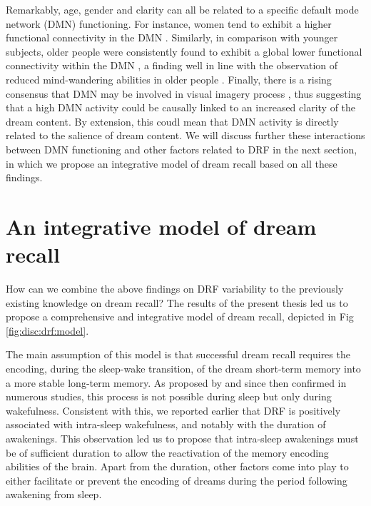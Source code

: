 Remarkably, age, gender and clarity can all be related to a specific default mode network (DMN) functioning. For instance, women tend to exhibit a higher functional connectivity in the DMN \citep{bluhm_default_2008}. Similarly, in comparison with younger subjects, older people were consistently found to exhibit a global lower functional connectivity within the DMN \citep{damoiseaux_reduced_2008, koch_effects_2010}, a finding well in line with the observation of reduced mind-wandering abilities in older people \citep{jackson_mind-wandering_2012}. Finally, there is a rising consensus that DMN may be involved in visual imagery process \citep{andrews-hanna_functional-anatomic_2010}, thus suggesting that a high DMN activity could be causally linked to an increased clarity of the dream content. By extension, this coudl mean that DMN activity is directly related to the salience of dream content. We will discuss further these interactions between DMN functioning and other factors related to DRF in the next section, in which we propose an integrative model of dream recall based on all these findings.

\section{An integrative model of dream recall}
\label{disc:drf:model}

How can we combine the above findings on DRF variability to the previously existing knowledge on dream recall?
The results of the present thesis led us to propose a comprehensive and integrative model of dream recall, depicted in Fig \ref{fig:disc:drf:model}.

The main assumption of this model is that successful dream recall requires the encoding, during the sleep-wake transition, of the dream short-term memory into a more stable long-term memory. As proposed by \citet{koulack_dream_1976} and since then confirmed in numerous studies, this process is not possible during sleep but only during wakefulness. Consistent with this, we reported earlier that DRF is positively associated with intra-sleep wakefulness, and notably with the duration of awakenings. This observation led us to propose that intra-sleep awakenings must be of sufficient duration to allow the reactivation of the memory encoding abilities of the brain. Apart from the duration, other factors come into play to either facilitate or prevent the encoding of dreams during the period following awakening from sleep.

